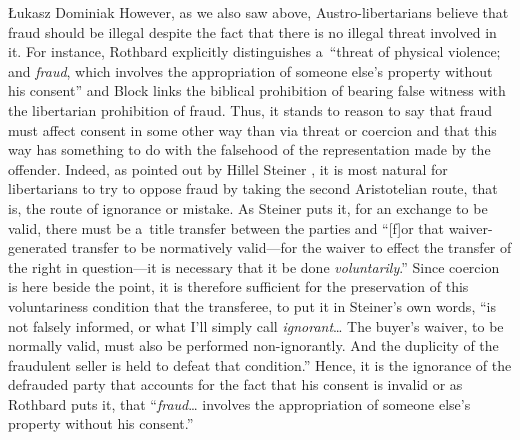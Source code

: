 \begin{artengenv}{Łukasz Dominiak}
However, as we also saw above, Austro-libertarians believe that fraud should be illegal despite the fact that there is no illegal threat involved in it. For instance, Rothbard 
\parencite*[][p.77]{rothbard_ethics_1998} %
 explicitly distinguishes a~``threat of physical violence; and \textit{fraud}, which involves the appropriation of someone else's property without his consent'' and Block 
\parencite*[][p.38]{block_natural_2015} %
 links the biblical prohibition of bearing false witness with the libertarian prohibition of fraud. Thus, it stands to reason to say that fraud must affect consent in some other way than via threat or coercion and that this way has something to do with the falsehood of the representation made by the offender. Indeed, as pointed out by Hillel Steiner 
\parencite*[][p.100]{steiner_asymmetric_2019}, %
 it is most natural for libertarians to try to oppose fraud by taking the second Aristotelian route, that is, the route of ignorance or mistake. As Steiner 
\parencite*[][p.100]{steiner_asymmetric_2019} %
 puts it, for an exchange to be valid, there must be a~title transfer between the parties and ``[f]or that waiver-generated transfer to be normatively valid---for the waiver to effect the transfer of the right in question---it is necessary that it be done \textit{voluntarily}.'' Since coercion is here beside the point, it is therefore sufficient for the preservation of this voluntariness condition that the transferee, to put it in Steiner's 
\parencite*[][p.100]{steiner_asymmetric_2019} %
 own words, ``is not falsely informed, or what I'll simply call \textit{ignorant}… The buyer's waiver, to be normally valid, must also be performed non-ignorantly. And the duplicity of the fraudulent seller is held to defeat that condition.'' Hence, it is the ignorance of the defrauded party that accounts for the fact that his consent is invalid or as Rothbard 
\parencite*[][p.77]{rothbard_ethics_1998} %
 puts it, that ``\textit{fraud}… involves the appropriation of someone else's property without his consent.''




\end{artengenv}

